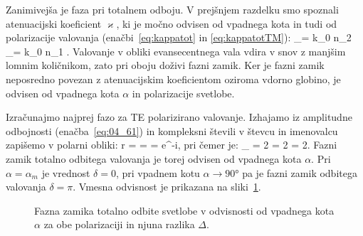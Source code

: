 Zanimivejša je faza pri totalnem odboju. V prejšnjem razdelku smo spoznali atenuacijski koeficient
$\varkappa$, ki je močno odvisen od vpadnega kota in tudi od polarizacije valovanja (enačbi~\ref{eq:kappatot} 
in \ref{eq:kappatotTM}):
\beq
\varkappa_{}= k_0 n_2  
\qquad {}\qquad
\varkappa_{}= k_0 n_1 .
\label{eq:04_83}
\eeq
Valovanje v obliki evansecentnega vala vdira v snov z manjšim lomnim količnikom, zato
pri oboju doživi fazni zamik. Ker je fazni zamik neposredno povezan z atenuacijskim
koeficientom oziroma vdorno globino, je odvisen od vpadnega kota $\alpha$ in polarizacije svetlobe. 


Izračunajmo najprej fazo za TE polarizirano valovanje. Izhajamo iz amplitudne odbojnosti (enačba~\ref{eq:04_61})
in kompleksni števili v števcu in imenovalcu zapišemo v polarni obliki:
\beq
r =  = 
= e^{-i\delta},
\label{eq:04_84}
\eeq
pri čemer je:
\beq
\delta_ = 2\arctan{} = 2\arctan{} = 
2\arctan{}.
\label{eq:04_85}
\eeq
Fazni zamik totalno odbitega valovanja je torej odvisen od vpadnega kota $\alpha$. 
Pri $\alpha = \alpha_m$ je vrednost $\delta=0$, pri vpadnem kotu $\alpha \to 90\si{\degree}$ pa je
fazni zamik odbitega valovanja $\delta = \pi$. Vmesna odvisnost je prikazana na sliki~\ref{fig:04_faza}.
\begin{figure}[ht]
\centering
\def\svgwidth{70truemm} 

\caption{Fazna zamika totalno odbite svetlobe v odvisnosti od vpadnega kota $\alpha$ za obe polarizaciji in 
njuna razlika $\Delta$.}
\label{fig:04_faza}
\end{figure}

